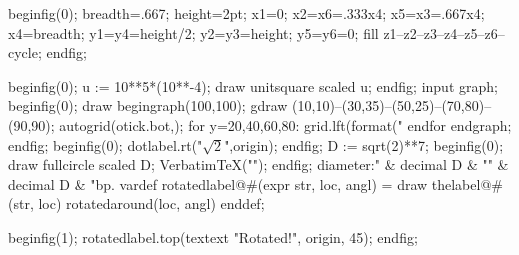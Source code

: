 \newbox\mympbox
\def\prependtomplibbox{\global\setbox\mympbox}%
\mplibcode
beginfig(0);
breadth=.667\mpdim\hsize;
height=2pt;
x1=0; x2=x6=.333x4; x5=x3=.667x4;
x4=breadth;
y1=y4=height/2; y2=y3=height; y5=y6=0;
fill z1--z2--z3--z4--z5--z6--cycle;
endfig;
\endmplibcode
\copy\mympbox
\copy\mympbox
\copy\mympbox
\copy\mympbox

\mplibnoforcehmode
{}%
\mplibcode
beginfig(0);
u := 10**5*(10**-4);
draw unitsquare scaled u;
endfig;
\endmplibcode
{}%
\mplibcode
  input graph;
  beginfig(0);
  draw begingraph(100,100);
    gdraw (10,10)--(30,35)--(50,25)--(70,80)--(90,90);
    autogrid(otick.bot,);
    for y=20,40,60,80:
      grid.lft(format("%
    endfor
    endgraph;
  endfig;
\endmplibcode
{}%
\mplibcode
beginfig(0);
dotlabel.rt("$\sqrt2$",origin);
endfig;
\endmplibcode
\leavevmode
\mplibcode
   D := sqrt(2)**7;
   beginfig(0);
   draw fullcircle scaled D;
   VerbatimTeX("\gdef\Dia{" & decimal D & "}");
   endfig;
\endmplibcode
diameter:\ifdefined\Dia\Dia\fi bp.%
\mplibcode
  vardef rotatedlabel@#(expr str, loc, angl) =
    draw thelabel@#(str, loc) rotatedaround(loc, angl)
  enddef;

  beginfig(1);
    rotatedlabel.top(textext "Rotated!", origin, 45);
  endfig;
\endmplibcode

\vfill
{}

